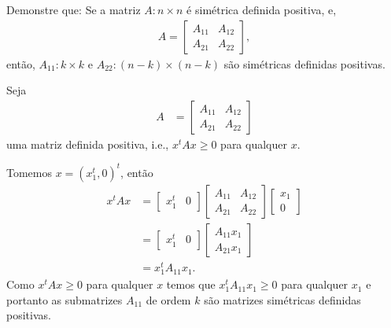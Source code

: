 \begin{questions}
    \question Demonstre que: Se a matriz $A : n \times n$ \'{e} sim\'{e}trica definida positiva, e,
    \begin{align*}
        A = \begin{bmatrix}
            A_{11} & A_{12} \\
            A_{21} & A_{22}
        \end{bmatrix},
    \end{align*}
    ent\~{a}o, $A_{11} : k \times k$ e $A_{22}: (n - k) \times (n - k)$ s\~{a}o sim\'{e}tricas definidas positivas.
    \begin{solution}
        Seja
        \begin{align*}
            A &= \begin{bmatrix}
                A_{11} & A_{12} \\
                A_{21} & A_{22}
            \end{bmatrix}
        \end{align*}
        uma matriz definida positiva, i.e., $x^t A x \geq 0$ para qualquer $x$.
        
        Tomemos $x = (x_1^t, 0)^t$, ent\~{a}o
        \begin{align*}
            x^t A x &= \begin{bmatrix}
                x_1^t & 0
            \end{bmatrix} \begin{bmatrix}
                A_{11} & A_{12} \\
                A_{21} & A_{22}
            \end{bmatrix} \begin{bmatrix}
                x_1 \\
                0
            \end{bmatrix} \\
            &= \begin{bmatrix}
                x_1^t & 0
            \end{bmatrix} \begin{bmatrix}
                A_{11} x_1 \\
                A_{21} x_1
            \end{bmatrix} \\
            &= x_1^t A_{11} x_1.
        \end{align*}
        Como $x^t A x \geq 0$ para qualquer $x$ temos que $x_1^t A_{11} x_1 \geq 0$ para qualquer $x_1$ e portanto as submatrizes $A_{11}$ de ordem $k$ s\~{a}o matrizes sim\'{e}tricas definidas positivas.


\end{solution}
\end{questions}
